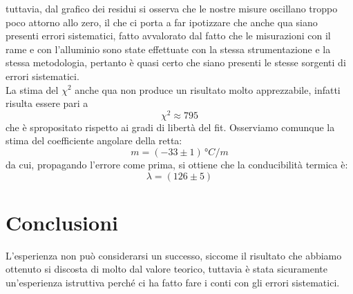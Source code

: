 \documentclass{article}
\begin{document}
tuttavia, dal grafico dei residui si osserva che le nostre misure oscillano troppo poco attorno allo zero, il che ci porta a far ipotizzare che anche qua siano presenti errori sistematici, fatto avvalorato dal fatto che le misurazioni con il rame e con l'alluminio sono state effettuate con la stessa strumentazione e la stessa metodologia, pertanto è quasi certo che siano presenti le stesse sorgenti di errori sistematici.	\\
La stima del $\chi^2$ anche qua non produce un risultato molto apprezzabile, infatti risulta essere pari a
$$
	\chi^2 \approx 795
$$
che è spropositato rispetto ai gradi di libertà del fit. Osserviamo comunque la stima del coefficiente angolare della retta:
\begin{equation}
	m = (-33 \pm 1) \, \unit{°C/m}
\end{equation}
da cui, propagando l'errore come prima, si ottiene che la conducibilità termica è:
\begin{equation}
	\lambda = (126 \pm 5)
\end{equation}

\section{Conclusioni}

L'esperienza non può considerarsi un successo, siccome il risultato che abbiamo ottenuto si discosta di molto dal valore teorico, tuttavia è stata sicuramente un'esperienza istruttiva perché ci ha fatto fare i conti con gli errori sistematici.
\end{document}
